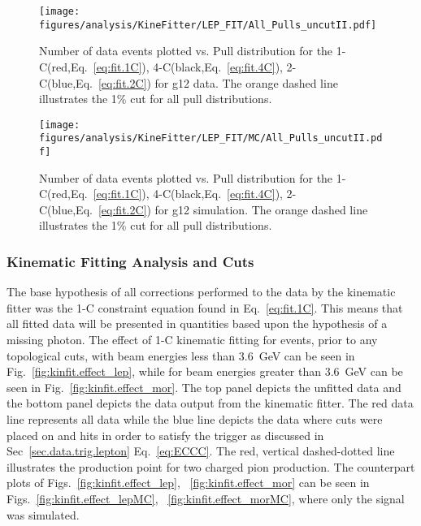 \begin{figure}[h!]\begin{center}
\texttt{[image: \\figures/analysis/KineFitter/LEP\_FIT/All\_Pulls\_uncutII.pdf]}
\caption[Number of data events plotted vs. Pull distribution for the 1-C(red), 4-C(black), 2-C(blue) for g12 data]{\label{fig:kinfit.analysispulls}Number of data events plotted vs. Pull distribution for the 1-C(red,Eq.~\ref{eq:fit.1C}), 4-C(black,Eq.~\ref{eq:fit.4C}), 2-C(blue,Eq.~\ref{eq:fit.2C}) for g12 data. The orange dashed line illustrates the 1\% cut for all pull distributions.}
\end{center}\end{figure}

\begin{figure}[h!]\begin{center}
\texttt{[image: \\figures/analysis/KineFitter/LEP\_FIT/MC/All\_Pulls\_uncutII.pdf]}
\caption[Number of data events plotted vs. Pull distribution for the 1-C(red), 4-C(black), 2-C(blue) for g12 simulation]{\label{fig:kinfit.analysispulls_MC}Number of data events plotted vs. Pull distribution for the 1-C(red,Eq.~\ref{eq:fit.1C}), 4-C(black,Eq.~\ref{eq:fit.4C}), 2-C(blue,Eq.~\ref{eq:fit.2C}) for g12 simulation. The orange dashed line illustrates the 1\% cut for all pull distributions.}
\end{center}\end{figure}
\FloatBarrier
%
%
%
\subsubsection{Kinematic Fitting Analysis and Cuts}\label{sec:analysis.fitting.compare}

The base hypothesis of all corrections performed to the data by the kinematic fitter was the 1-C constraint equation found in Eq.~\ref{eq:fit.1C}. This means that all fitted data will be presented in quantities based upon the hypothesis of a missing photon. The effect of 1-C kinematic fitting for events, prior to any topological cuts, with beam energies less than 3.6~GeV can be seen in Fig.~\ref{fig:kinfit.effect_lep}, while for beam energies greater than 3.6~GeV can be seen in Fig.~\ref{fig:kinfit.effect_mor}. The top panel depicts the unfitted data and the bottom panel depicts the data output from the kinematic fitter. The red data line represents all data while the blue line depicts the data where cuts were placed on  and  hits in order to satisfy the trigger as discussed in Sec~\ref{sec.data.trig.lepton} Eq.~\ref{eq:ECCC}. The red, vertical dashed-dotted line illustrates the production point for two charged pion production. The  counterpart plots of Figs.~\ref{fig:kinfit.effect_lep}, ~\ref{fig:kinfit.effect_mor} can be seen in Figs.~\ref{fig:kinfit.effect_lepMC}, ~\ref{fig:kinfit.effect_morMC}, where only the \pizT signal was simulated.

